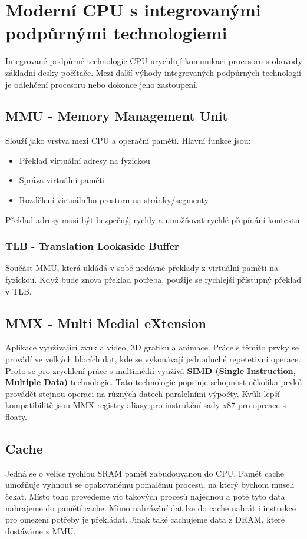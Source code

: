 \section{Moderní CPU s integrovanými podpůrnými technologiemi}
\label{sec:moderni-cpu}
Integrované podpůrné technologie CPU urychlují komunikaci procesoru s obovody základní desky počítače.
Mezi další výhody integrovaných podpůrných technologií je odlehčení procesoru nebo dokonce jeho zastoupení.
\subsection{MMU - Memory Management Unit}
Slouží jako vrstva mezi CPU a operační pamětí.
Hlavní funkce jsou:
\begin{itemize}
  \item Překlad virtuální adresy na fyzickou
  \item Správa virtuální paměti
  \item Rozdělení virtuálního prostoru na stránky/segmenty
\end{itemize}
Překlad adresy musí být bezpečný, rychly a umožňovat rychlé přepínání kontextu.
\subsubsection{TLB - Translation Lookaside Buffer}
Součást MMU, která ukládá v sobě nedávné překlady z virtuální paměti na fyzickou.
Když bude znova překlad potřeba, použije se rychlejši přístupný překlad v TLB.
\subsection{MMX - Multi Medial eXtension}
Aplikace využívající zvuk a video, 3D grafiku a animace.
Práce s těmito prvky se provádí ve velkých blocích dat, kde se vykonávají jednoduché repetetivní operace.
Proto se pro zrychlení práce s multimédií využívá \textbf{SIMD (Single Instruction, Multiple Data)} technologie.
Tato technologie popsiuje schopnost několika prvků provádět stejnou operaci na různých datech paralelními výpočty.
Kvůli lepší kompatibilitě jsou MMX registry aliasy pro instrukční sady x87 pro opreace s floaty.
\subsection{Cache}
Jedná se o velice rychlou SRAM paměť zabudouvanou do CPU.
Paměť cache umožňuje vyhnout se opakovanému pomalému procesu, na který bychom museli čekat.
Místo toho provedeme víc takových procesů najednou a poté tyto data nahrajeme do pamětí cache.
Mimo nahrávání dat lze do cache nahrát i instrukce pro omezení potřeby je překládat.
Jinak také cachujeme data z DRAM, které dostáváme z MMU.
